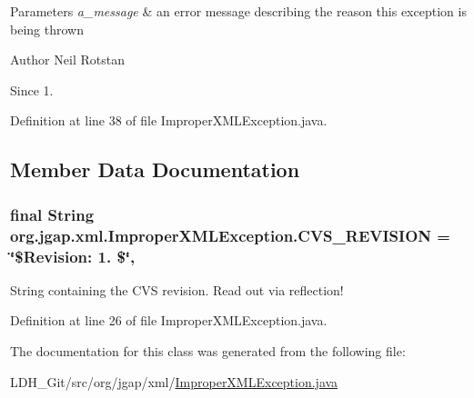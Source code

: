 \begin{DoxyParams}{Parameters}
{\em a\-\_\-message} & an error message describing the reason this exception is being thrown\\
\hline
\end{DoxyParams}
\begin{DoxyAuthor}{Author}
Neil Rotstan 
\end{DoxyAuthor}
\begin{DoxySince}{Since}
1. 
\end{DoxySince}


Definition at line 38 of file Improper\-X\-M\-L\-Exception.\-java.



\subsection{Member Data Documentation}
\hypertarget{classorg_1_1jgap_1_1xml_1_1_improper_x_m_l_exception_a841680ba186e7a7c7dcd103f14eb7e8c}{
\subsubsection[{C\-V\-S\-\_\-\-R\-E\-V\-I\-S\-I\-O\-N}]{\setlength{\rightskip}{0pt plus 5cm}final String org.\-jgap.\-xml.\-Improper\-X\-M\-L\-Exception.\-C\-V\-S\-\_\-\-R\-E\-V\-I\-S\-I\-O\-N = \char`\"{}\$Revision\-: 1. \$\char`\"{}\hspace{0.3cm}{\ttfamily [static]}, {\ttfamily [private]}}}\label{classorg_1_1jgap_1_1xml_1_1_improper_x_m_l_exception_a841680ba186e7a7c7dcd103f14eb7e8c}
String containing the C\-V\-S revision. Read out via reflection! 

Definition at line 26 of file Improper\-X\-M\-L\-Exception.\-java.



The documentation for this class was generated from the following file\-:\begin{DoxyCompactItemize}
\item 
L\-D\-H\-\_\-\-Git/src/org/jgap/xml/\hyperlink{_improper_x_m_l_exception_8java}{Improper\-X\-M\-L\-Exception.\-java}\end{DoxyCompactItemize}
